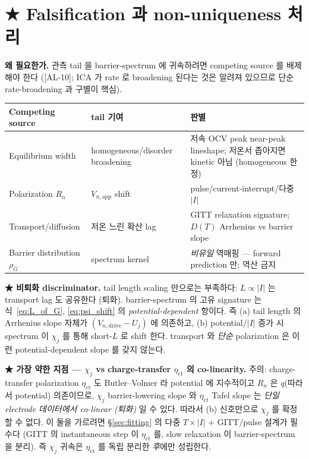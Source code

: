 \documentclass[11pt,a4paper]{article}
\newcommand{\app}{\mathrm{app}}
\newcommand{\dimedrive}{\mathrm{drive}}
\newcommand{\AL}[1]{\textsf{[AL-#1]}}
\begin{document}
\section{★ Falsification 과 non-uniqueness 처리}\label{sec:falsify}
\textbf{왜 필요한가.} 관측 tail 을 barrier-spectrum 에 귀속하려면 competing source 를
배제해야 한다 (\AL{10}; ICA 가 rate 로 broadening 된다는 것은 알려져 있으므로
\cite{dubarry2022,fly2020} 단순 rate-broadening 과 구별이 핵심).
\begin{longtable}{p{} p{} p{}}
\toprule Competing source & tail 기여 & 판별 \\ \midrule \endhead
Equilibrium width & homogeneous/disorder broadening & 저속 OCV peak near-peak lineshape; 저온서 좁아지면 kinetic 아님 (homogeneous 한정) \\
Polarization $R_n$ & $V_{n,\app}$ shift & pulse/current-interrupt/다중 $|I|$ \\
Transport/diffusion & 저온 느린 확산 lag & GITT relaxation signature; $D(T)$ Arrhenius vs barrier slope \\
Barrier distribution $\rho_G$ \cite{plonka2001} & spectrum kernel & \emph{비유일} 역매핑 — forward prediction 만; 역산 금지 \\
\bottomrule
\end{longtable}

\textbf{★ 비퇴화 discriminator.} tail length scaling 만으로는 부족하다: $L\propto|I|$ 는
transport lag 도 공유한다 (퇴화). barrier-spectrum 의 고유 signature 는 식~\eqref{eq:L_of_G},
\eqref{eq:psi_shift} 의 \emph{potential-dependent} 항이다. 즉 (a) tail length 의 Arrhenius
slope 자체가 $(V_{n,\dimedrive}-U_j)$ 에 의존하고, (b) potential/$|I|$ 증가 시 spectrum 이
$\chi_j$ 를 통해 short-$L$ 로 shift 한다. transport 와 \emph{단순} polarization 은 이런
potential-dependent slope 를 갖지 않는다.

\textbf{★ 가장 약한 지점 — $\chi_j$ vs charge-transfer $\eta_{\mathrm{ct}}$ 의 co-linearity.}
주의: charge-transfer polarization $\eta_{\mathrm{ct}}$ 도 Butler--Volmer 라 potential 에
지수적이고 $R_n$ 은 $q$(따라서 potential) 의존이므로, $\chi_j$ barrier-lowering slope 와
$\eta_{\mathrm{ct}}$ Tafel slope 는 \emph{단일 electrode 데이터에서 co-linear (퇴화)} 일 수
있다. 따라서 (b) 신호만으로 $\chi_j$ 를 확정할 수 없다. 이 둘을 가르려면 \S\ref{sec:fitting}
의 다중 $T\times|I|$ + GITT/pulse 설계가 필수다 (GITT 의 instantaneous step 이 $\eta_{\mathrm{ct}}$
를, slow relaxation 이 barrier-spectrum 을 분리). 즉 $\chi_j$ 귀속은 $\eta_{\mathrm{ct}}$ 를
독립 분리한 \emph{후}에만 성립한다.
\end{document}
